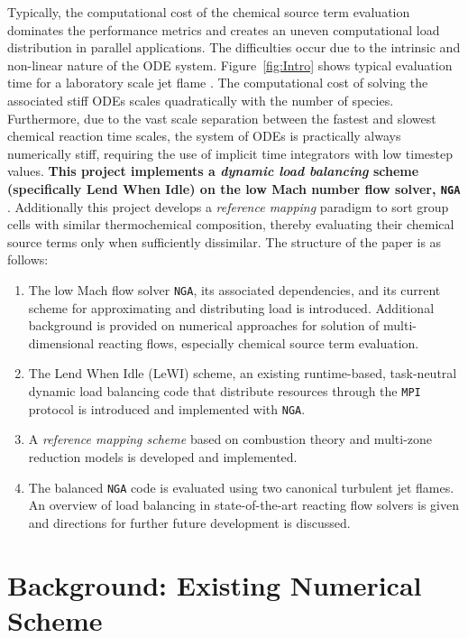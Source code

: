 \documentclass[letterpaper,twocolumn,10pt]{article}
\begin{document}
Typically, the computational cost of the chemical source term evaluation dominates the performance metrics and creates an uneven computational load distribution in parallel applications. The difficulties occur due to the intrinsic and non-linear nature of the ODE system. Figure~\ref{fig:Intro} shows typical evaluation time for a laboratory scale jet flame \cite{Lacey_thesis}. The computational cost of solving the associated stiff ODEs scales quadratically with the number of species. Furthermore, due to the vast scale separation between the fastest and slowest chemical reaction time scales, the system of ODEs is practically always numerically stiff, requiring the use of implicit time integrators with low timestep values. \textbf{This project implements a \emph{dynamic load balancing} scheme (specifically Lend When Idle) on the low Mach number flow solver, \texttt{NGA} \cite{DESJARDINS2008,MACART2016}}. Additionally this project develops a \emph{reference mapping} paradigm to sort group cells with similar thermochemical composition, thereby evaluating their chemical source terms only when sufficiently dissimilar. The structure of the paper is as follows:
\begin{enumerate}
\item The low Mach flow solver \texttt{NGA}, its associated dependencies, and its current scheme for approximating and distributing load is introduced. Additional background is provided on numerical approaches for solution of multi-dimensional reacting flows, especially chemical source term evaluation.
\item The Lend When Idle (LeWI) scheme, an existing runtime-based, task-neutral dynamic load balancing code that distribute resources through the \texttt{MPI} protocol is introduced and implemented with \texttt{NGA}.
\item A \emph{reference mapping scheme} based on combustion theory and multi-zone reduction models is developed and implemented.
\item The balanced \texttt{NGA} code is evaluated using two canonical turbulent jet flames. An overview of load balancing in state-of-the-art reacting flow solvers is given and directions for further future development is discussed.
\end{enumerate}

\section{Background: Existing Numerical Scheme}
\end{document}

